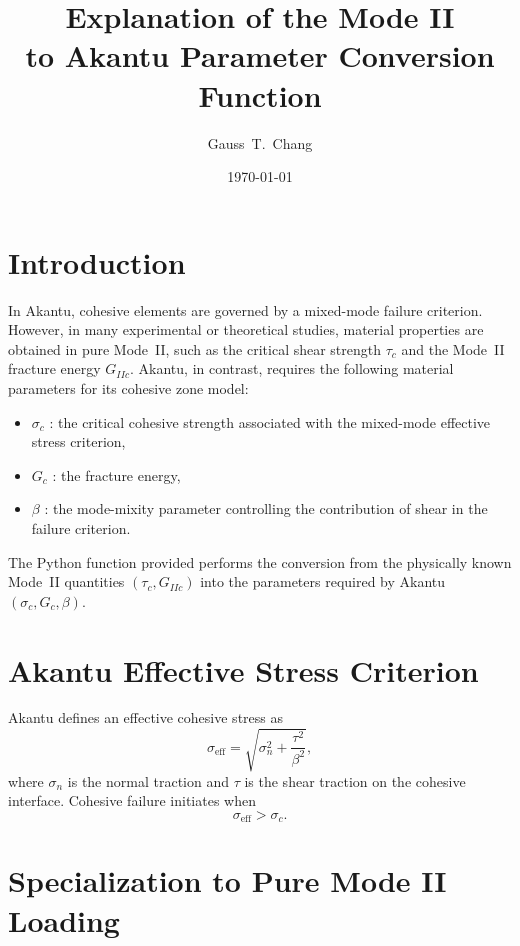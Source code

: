 \documentclass[a4paper, 12pt, oneside, onecolumn]{article}
\title{Explanation of the Mode II\\to Akantu Parameter Conversion Function}
\author[$\dagger$]{Gauss~T.~Chang}
\affil[$\dagger$]{Department of Civil Engineering, \url{R14521220@ntu.edu.tw}}
\date{\today}
\begin{document}
\maketitle

\section{Introduction}

In Akantu, cohesive elements are governed by a mixed-mode failure criterion.
However, in many experimental or theoretical studies, material properties are
obtained in pure Mode~II, such as the critical shear strength 
$\tau_{c}$ and the Mode~II fracture energy $G_{IIc}$. Akantu, in contrast, 
requires the following material parameters for its cohesive zone model:

\begin{itemize}
    \item $\sigma_{c}$ : the critical cohesive strength associated with the 
    mixed-mode effective stress criterion,
    \item $G_{c}$ : the fracture energy,
    \item $\beta$ : the mode-mixity parameter controlling the contribution of 
    shear in the failure criterion.
\end{itemize}

The Python function provided performs the conversion from the physically known
Mode~II quantities $(\tau_{c}, G_{IIc})$ into the parameters required by 
Akantu $(\sigma_{c}, G_{c}, \beta)$.

\section{Akantu Effective Stress Criterion}

Akantu defines an effective cohesive stress as
\begin{equation}
    \sigma_{\text{eff}}
    =\sqrt{\sigma_{n}^{2}+\frac{\tau^{2}}{\beta^{2}}},    
\end{equation}
where $\sigma_{n}$ is the normal traction and $\tau$ is the shear traction on 
the cohesive interface. Cohesive failure initiates when
\begin{equation}
    \sigma_{\text{eff}} > \sigma_{c}.
\end{equation}

\section{Specialization to Pure Mode II Loading}
\end{document}
